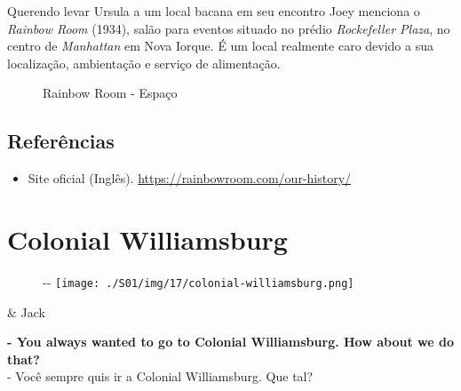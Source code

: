 Querendo levar Ursula a um local bacana em seu encontro Joey menciona o
\emph{Rainbow Room} (1934), salão para eventos situado no prédio
\emph{Rockefeller Plaza}, no centro de \emph{Manhattan} em Nova Iorque.
É um local realmente caro devido a sua localização, ambientação e
serviço de alimentação.

\begin{figure}
  \centering
    \caption{Rainbow Room - Espaço\label{fig:rainbow-room-espa-o}}
\end{figure}

\hypertarget{referuxeancias}{%
\subsection{Referências}\label{referuxeancias}}

\begin{itemize}
\tightlist
\item
  \sloppy Site oficial (Inglês). \url{https://rainbowroom.com/our-history/}
\end{itemize}

\hypertarget{colonial-williamsburg}{%
\section{Colonial Williamsburg}\label{colonial-williamsburg}}

\begin{figure}[!ht]
  \begin{adjustwidth}{-\oddsidemargin-1in}{-\rightmargin}
    \centering
    \texttt{[image: ./S01/img/17/colonial-williamsburg.png]}
  \end{adjustwidth}
\end{figure}

\begin{tcolorbox}[enhanced,center upper,
    drop fuzzy shadow southeast, boxrule=0.3pt,
    lower separated=false,
    colframe=black!30!dialogoBorder,colback=white]
\begin{minipage}[c]{0.16\linewidth}
   & \centering \scriptsize{Jack}
\end{minipage}
\hfill
\begin{minipage}[c]{0.8\linewidth}
  \textbf{- You always wanted to go to Colonial Williamsburg. How about we do that?}\\
  - Você sempre quis ir a Colonial Williamsburg. Que tal?
\end{minipage}
\end{tcolorbox}

